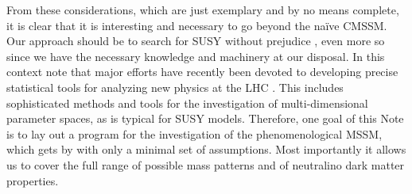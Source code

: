 From these considerations, which are just exemplary and by no means complete, 
it is clear that it is interesting and necessary to go beyond the na\"ive 
CMSSM. Our approach should be to search for SUSY without prejudice \cite{Berger:2008cq,Conley:2010du},  
even more so since we have the necessary knowledge and machinery at 
our disposal. In this context note that major efforts have recently been 
devoted to developing precise statistical tools for analyzing new physics 
at the LHC \cite{Lyons:2003bw}. 
This includes sophisticated methods and tools for the investigation of 
multi-dimensional parameter spaces, as is typical for SUSY models. 
Therefore, one goal of this Note is to lay out a program for the investigation of the 
phenomenological MSSM, which gets by with only a minimal set of assumptions. 
Most importantly it allows us to cover the full range of possible mass patterns 
and of neutralino dark matter properties. 

